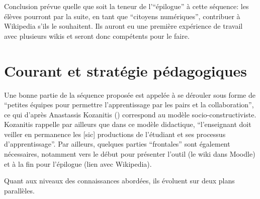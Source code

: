 \documentclass[11pt,bibliography=totoc]{scrartcl}
\begin{document}
Conclusion prévue quelle que soit la teneur de l'``épilogue'' à cette séquence:
les élèves pourront par la suite, en tant que ``citoyens numériques'',
contribuer à Wikipedia s'ils le souhaitent. Ils auront eu une première
expérience de travail avec plusieurs wikis et seront donc compétents pour le
faire.

\section{Courant et stratégie pédagogiques}
Une bonne partie de la séquence proposée est appelée à se dérouler sous forme de
``petites équipes pour permettre l'apprentissage par les pairs et la
collaboration'', ce qui d'après Anastassis Kozanitis (\cite{kozanitis})
correspond au modèle socio-constructiviste. Kozanitis rappelle par ailleurs que
dans ce modèle didactique, ``l'enseignant doit veiller en permanence les [sic]
productions de l'étudiant et ses processus d'apprentissage''.  Par ailleurs,
quelques parties ``frontales'' sont également nécessaires, notamment vers le
début pour présenter l'outil (le wiki dans Moodle) et à la fin pour l'épilogue
(lien avec Wikipedia).

Quant aux niveaux des connaissances abordées, ils évoluent sur deux plans
parallèles.
\end{document}
